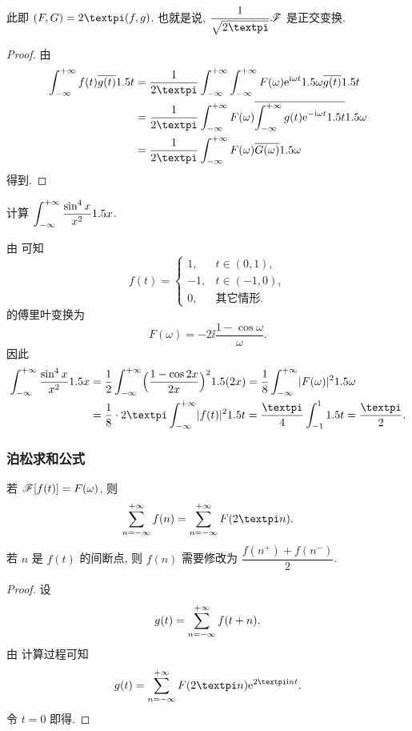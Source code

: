 此即 $(F,G)=2\cpi(f,g)$.
也就是说, $\dfrac1{\sqrt{2\cpi}}\msf$ 是正交变换.

\begin{proof}
  由
  \begin{align*}
    \intff f(t)\ov{g(t)}\d t
    &=\frac1{2\cpi}\intff \intff F(\omega)\ee^{\ii \omega t}\d \omega \ov{g(t)}\d t\\
    &=\frac1{2\cpi}\intff F(\omega)\ov{\intff g(t)\ee^{-\ii \omega t}\d t}\d \omega\\
    &=\frac1{2\cpi}\intff F(\omega)\ov{G(\omega)}\d \omega
  \end{align*}
  得到.
\end{proof}

\begin{example}
  计算 $\displaystyle\int_{-\infty}^{+\infty} \frac{\sin^4 x}{x^2}1.5 x$.
\end{example}

\begin{solution}
  由 可知
  \[
    f(t)=\begin{cases}
      1, &t\in(0,1),\\
      -1, &t\in(-1,0),\\
      0,&\text{其它情形.}
    \end{cases}
  \]
  的傅里叶变换为
  \[
    F(\omega)=-2\ii\frac{1-\cos \omega}{\omega}.
  \]
  因此
  \begin{align*}
    \intff \frac{\sin^4 x}{x^2}\d x
    &=\frac12\intff \Bigl(\frac{1-\cos 2x}{2x}\Bigr)^2\d (2x)
    =\frac18\intff \abs{F(\omega)}^2\d \omega\\
    &=\frac18\cdot2\cpi\intff \abs{f(t)}^2\d t
    =\frac\cpi 4\int_{-1}^1 \d t
    =\frac\cpi2.
  \end{align*}
\end{solution}


\subsubsection{泊松求和公式}

\begin{theorem}[泊松求和公式]
  \label{thm:poisson-summation-formula}
  若 $\mathscr{F}[f(t)]=F(\omega)$, 则
  \[
    \sumff f(n)=\sumff F(2\cpi n).
  \]
  若 $n$ 是 $f(t)$ 的间断点, 则 $f(n)$ 需要修改为 $\dfrac{f(n^+)+f(n^-)}2$.
\end{theorem}

\begin{proof}
  设
  \[
    g(t)=\displaystyle\sum_{n=-\infty}^{+\infty} f(t+n).
  \]
  由 计算过程可知
  \[
    g(t)=\sumff F(2\cpi n)\ee^{2\cpi \ii  n t}.
  \]
  令 $t=0$ 即得.
\end{proof}

